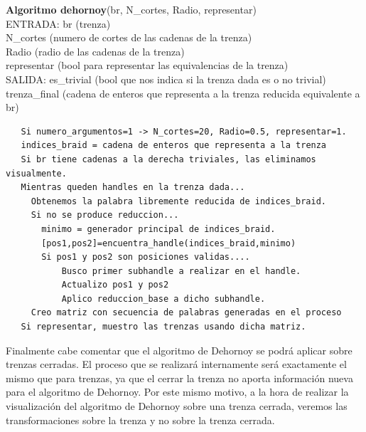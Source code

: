 \begin{alg}
	\textbf{Algoritmo dehornoy}(br, N\_cortes, Radio, representar)\\
	ENTRADA: br (trenza)\\
	\hspace*{2.2cm} N\_cortes (numero de cortes de las cadenas de la trenza)\\
	\hspace*{2.2cm} Radio (radio de las cadenas de la trenza)\\
	\hspace*{2.2cm} representar (bool para representar las equivalencias de la trenza)\\
	SALIDA: \hspace{0.4cm} es\_trivial (bool que nos indica si la trenza dada es o no trivial) \\
	\hspace*{2.2cm} trenza\_final (cadena de enteros que representa a la trenza reducida equivalente a br)
	
\begin{lstlisting}
   Si numero_argumentos=1 -> N_cortes=20, Radio=0.5, representar=1.
   indices_braid = cadena de enteros que representa a la trenza
   Si br tiene cadenas a la derecha triviales, las eliminamos visualmente.
   Mientras queden handles en la trenza dada...
	 Obtenemos la palabra libremente reducida de indices_braid.
	 Si no se produce reduccion...
	   minimo = generador principal de indices_braid.
	   [pos1,pos2]=encuentra_handle(indices_braid,minimo)
	   Si pos1 y pos2 son posiciones validas....
		   Busco primer subhandle a realizar en el handle.
		   Actualizo pos1 y pos2
		   Aplico reduccion_base a dicho subhandle.
	 Creo matriz con secuencia de palabras generadas en el proceso
   Si representar, muestro las trenzas usando dicha matriz.			   
\end{lstlisting}
\end{alg}

Finalmente cabe comentar que el algoritmo de Dehornoy se podrá aplicar sobre trenzas cerradas. El proceso que se realizará internamente será exactamente el mismo que para trenzas, ya que el cerrar la trenza no aporta información nueva para el algoritmo de Dehornoy. Por este mismo motivo, a la hora de realizar la visualización del algoritmo de Dehornoy sobre una trenza cerrada, veremos las transformaciones sobre la trenza y no sobre la trenza cerrada. \\

